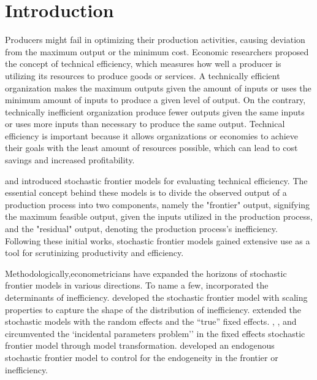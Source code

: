 
\section{Introduction}\label{sec_intro}


Producers might fail in optimizing their production activities, causing deviation from the maximum output or the minimum cost. Economic researchers proposed the concept of technical efficiency, which measures how well a producer is utilizing its resources to produce goods or services. A technically efficient organization makes the maximum outputs given the amount of inputs or uses the minimum amount of inputs to produce a given level of output. On the contrary, technically inefficient organization produce fewer outputs given the same inputs or uses more inputs than necessary to produce the same output. Technical efficiency is important because it allows organizations or economies to achieve their goals with the least amount of resources possible, which can lead to cost savings and increased profitability. 

\cite{aignerFormulationEstimationStochastic1977} and \cite{meeusen1977efficiency} introduced stochastic frontier models for evaluating technical efficiency. The essential concept behind these models is to divide the observed output of a production process into two components, namely the "frontier" output, signifying the maximum feasible output, given the inputs utilized in the production process, and the "residual" output, denoting the production process's inefficiency. Following these initial works, stochastic frontier models gained extensive use as a tool for scrutinizing productivity and efficiency. 

Methodologically,econometricians have expanded the horizons of stochastic frontier models in various directions. To name a few, \cite{battese1995model} incorporated the determinants of inefficiency. \cite{wang2003stochastic} developed the stochastic frontier model with scaling properties to capture the shape of the distribution of inefficiency. \cite{greene2005fixed} extended the stochastic models with the random effects and the “true” fixed effects. \cite{belotti2018consistent}, \cite{chen2014consistent}, and \cite{ wang2010estimating} circumvented the ‘incidental parameters problem’’ in the fixed effects stochastic frontier model through model transformation. \cite{karakaplan2017handling} developed an endogenous stochastic frontier model to control for the endogeneity in the frontier or inefficiency. 


